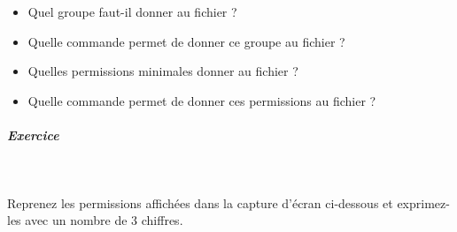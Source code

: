 \documentclass[11pt,a4paper]{article}
\begin{document}
					\begin{itemize}
				
			\item 
									Quel groupe faut-il donner au fichier ?
									\par
				 \textcolor{gray}{\underline{\hspace*{10em}}} 
			\item 
									Quelle commande permet de donner ce groupe au fichier ?
									\par
				 \textcolor{gray}{\underline{\hspace*{3em}}}  \textcolor{gray}{\underline{\hspace*{10em}}}  \textcolor{gray}{\underline{\hspace*{10em}}} 
			\item 
									Quelles permissions minimales donner au fichier ?                
									\par
				 \textcolor{gray}{\underline{\hspace*{1em}}}  \textcolor{gray}{\underline{\hspace*{1em}}}  \textcolor{gray}{\underline{\hspace*{1em}}}  \textcolor{gray}{\underline{\hspace*{1em}}}  \textcolor{gray}{\underline{\hspace*{1em}}}  \textcolor{gray}{\underline{\hspace*{1em}}}  \textcolor{gray}{\underline{\hspace*{1em}}}  \textcolor{gray}{\underline{\hspace*{1em}}}  \textcolor{gray}{\underline{\hspace*{1em}}} 
			\item 
									Quelle commande permet de donner ces permissions au fichier ?
									\par
				 \textcolor{gray}{\underline{\hspace*{3em}}}  \textcolor{gray}{\underline{\hspace*{2em}}}  \textcolor{gray}{\underline{\hspace*{10em}}} 
					\end{itemize}
				
			
		\subparagraph{Exercice} 
		
					\textcolor{white}{.} \par
				
            \par
          
					Reprenez les permissions affich\'ees dans la capture d'\'ecran ci-dessous 
					et exprimez-les avec un nombre de 3 chiffres.  
				
\end{document}
